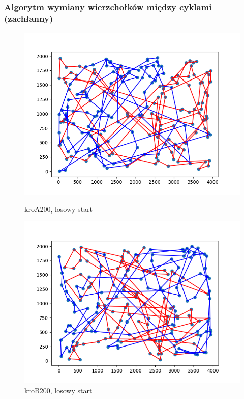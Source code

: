 \documentclass[11pt]{article}
\begin{document}
\subsubsection{Algorytm wymiany wierzchołków między cyklami (zachłanny)}
\begin{figure}[H]
    \centering
    \begin{minipage}[t]{0.45\textwidth}
        \centering
        \includegraphics[width=\linewidth]{best_paths/kroA200/traverse_greedy_shuffle/randomstart.png}
        \caption{kroA200, losowy start}
    \end{minipage}
    \hfill
    \begin{minipage}[t]{0.45\textwidth}
        \centering
        \includegraphics[width=\linewidth]{best_paths/kroB200/traverse_greedy_shuffle/randomstart.png}
        \caption{kroB200, losowy start}
    \end{minipage}


\end{figure}
\end{document}

